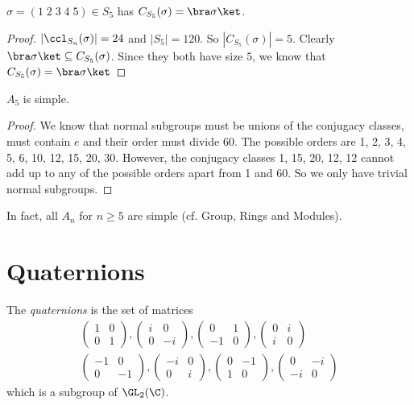 \documentclass[a4paper]{article}
\begin{document}
  \begin{lemma}
    $\sigma = (1\; 2\; 3\; 4\; 5)\in S_5$ has $C_{S_5}(\sigma) = \bra \sigma \ket$. \end{lemma}

  \begin{proof}
    $|\ccl_{S_n}(\sigma)| = 24$ and $|S_5| = 120$. So $|C_{S_5}(\sigma)| = 5$. Clearly $\bra \sigma \ket \subseteq C_{S_5}(\sigma)$. Since they both have size $5$, we know that $C_{S_5}(\sigma) = \bra \sigma\ket$
  \end{proof}

  \begin{thm}
    $A_5$ is simple.
  \end{thm}

  \begin{proof}
    We know that normal subgroups must be unions of the conjugacy classes, must contain $e$ and their order must divide 60. The possible orders are 1, 2, 3, 4, 5, 6, 10, 12, 15, 20, 30. However, the conjugacy classes 1, 15, 20, 12, 12 cannot add up to any of the possible orders apart from 1 and 60. So we only have trivial normal subgroups.
  \end{proof}
  In fact, all $A_n$ for $n\geq 5$ are simple (cf. Group, Rings and Modules).

  \section{Quaternions}
  \begin{defi}[Quaternions]
    The \emph{quaternions} is the set of matrices
    \begin{gather*}
      \begin{pmatrix}
        1&0\\0&1
      \end{pmatrix}, 
      \begin{pmatrix}
        i & 0\\0&-i
      \end{pmatrix},
      \begin{pmatrix}
        0&1\\-1&0
      \end{pmatrix},
      \begin{pmatrix}
        0&i\\i&0
      \end{pmatrix}
      \\
      \begin{pmatrix}
        -1&0\\0&-1
      \end{pmatrix}, 
      \begin{pmatrix}
        -i & 0\\0&i
      \end{pmatrix},
      \begin{pmatrix}
        0&-1\\1&0
      \end{pmatrix},
      \begin{pmatrix}
        0&-i\\-i&0
      \end{pmatrix}
    \end{gather*}
    which is a subgroup of $\GL_2(\C)$.
  \end{defi}
\end{document}

